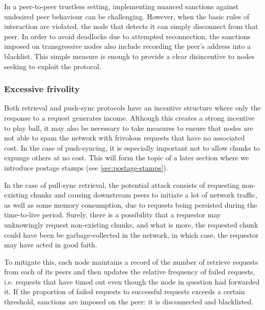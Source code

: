 In a peer-to-peer trustless setting, implementing nuanced sanctions against undesired peer behaviour can be challenging. However, when the basic rules of interaction are violated, the node that detects it can simply disconnect from that peer. In order to avoid deadlocks due to attempted reconnection, the sanctions imposed on transgressive nodes also include recording the peer's address into a blacklist. This simple measure is enough to provide a clear disincentive to nodes seeking to exploit the protocol. 

\subsubsection{Excessive frivolity}

Both retrieval and push-sync protocols have an incentive structure where only the response to a request generates income. Although this creates a strong incentive to play ball, it may also be necessary to take measures to ensure that nodes are not able to spam the network with frivolous requests that have no associated cost. In the case of push-syncing, it is especially important not to allow chunks to expunge others at no cost. This will form the topic of a later section where we introduce postage stamps (see \ref{sec:postage-stamps}).

In the case of pull-sync retrieval, the potential attack consists of requesting non-existing chunks and causing downstream peers to initiate a lot of network traffic, as well as some memory consumption, due to requests being persisted during the time-to-live period.
Surely, there is a possibility that a requestor may unknowingly request non-existing chunks, and what is more, the requested chunk could have been be garbage-collected in the network, in which case, the requestor may have acted in good faith. 

To mitigate this, each node maintains a record of the number of retrieve requests from each of its peers and then updates the relative frequency of failed requests, i.e. requests that have timed out even though the node in question had forwarded it. If the proportion of failed requests to successful requests exceeds a certain threshold, sanctions are imposed on the peer: it is disconnected and blacklisted.

% 
%

